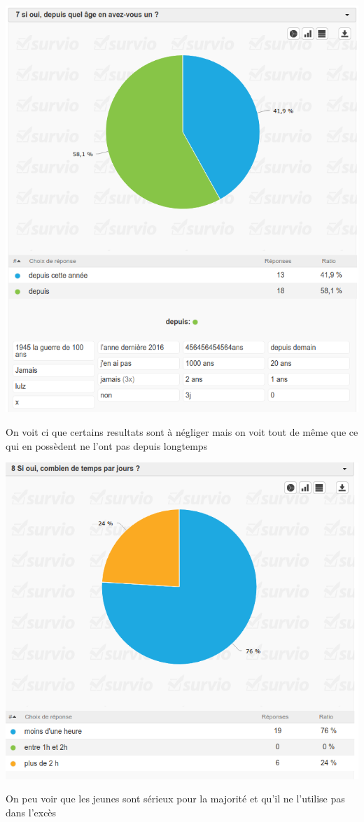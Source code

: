 \documentclass[12pt, a4paper]{report}
\begin{document}
\begin{center}
\includegraphics[scale=0.4]{7.png}

On voit ci que certains resultats sont à négliger mais on voit tout de même que ce qui en possèdent ne l'ont pas depuis longtemps
\end{center}

\begin{center}
\includegraphics[scale=0.5]{8.png}

On peu voir que les jeunes sont sérieux pour la majorité et qu'il ne l'utilise pas dans l'excès
\end{center}
\end{document}
